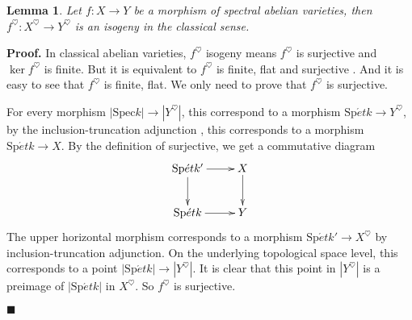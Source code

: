 \documentclass[12pt]{article}
\newtheorem{lemma}[theorem]{Lemma}
\theoremstyle{thry}
\renewenvironment{proof}
{\par \noindent \textbf{Proof.}}
{ \par \hfill $\blacksquare$ \quad \par }
\def  \Spec     {\mathrm{Spec}}
\def  \Spet     {\mathrm{Sp}\acute{e}t}
\begin{document}
\begin{lemma} 
	Let $f: X \to Y$ be a morphism of spectral abelian varieties, then $f^{\heartsuit}: X^{\heartsuit} \to Y^{\heartsuit}$ is an isogeny in the classical sense.
\end{lemma}
\begin{proof}
	In classical abelian varieties, $f^{\heartsuit}$ isogeny means $f^{\heartsuit}$ is surjective and $\ker f^{\heartsuit}$ is finite. But it is equivalent  to $f^{\heartsuit}$ is finite, flat and surjective  \cite[Proposition 7.1]{milne1986abelian}. And it is easy to see that $f^{\heartsuit}$ is finite, flat. We only need to prove that $f^{\heartsuit}$ is surjective.  
	
	For every morphism $|\Spec k| \to |Y^{\heartsuit}|$, this correspond to  a morphism $\Spet k \to Y^{\heartsuit}$, by the inclusion-truncation adjunction \cite[Proposition 1.4.6.3]{lu-SAG}, this corresponds to a morphism $\Spet k \to X$. By the  definition of  surjective, we get a commutative diagram
	$$
	\xymatrix{
	\Spet k'  \ar[d]  \ar[r]  &  X  \ar[d]   \\
	\Spet  k   \ar[r]       &   Y  \\
	}
	$$
	The upper horizontal morphism corresponds to a morphism $\Spet k' \to X^{\heartsuit}$ by inclusion-truncation adjunction. On the underlying topological space level, this corresponds to  a point $|\Spet k | \to |Y^{\heartsuit}|$. It is clear that this point in $|Y^{\heartsuit}|$ is a preimage of $|\Spet k|$ in $X^{\heartsuit}$. So $f^{\heartsuit}$ is surjective. 
\end{proof}
\end{document}

